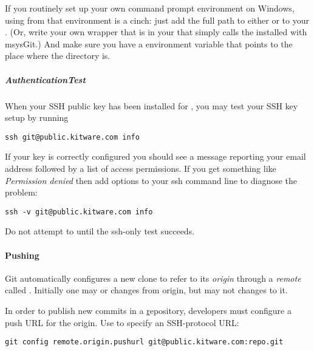 If you routinely set up your own command prompt environment on Windows, using
 from that environment is a cinch: just add the full path
to either  or  to your . (Or, write your
own  wrapper that is in your  that simply calls the
 installed with msysGit.) And make sure you have a 
environment variable that points to the place where the 
directory is.


\subparagraph{AuthenticationTest}
\label{subpar:AuthenticationTest}

When your SSH public key has been installed for ,
you may test your SSH key setup by running

\begin{verbatim}
ssh git@public.kitware.com info
\end{verbatim}

If your key is correctly configured you should see a message reporting your
email address followed by a list of access permissions. If you get something
like \textit{Permission denied} then add  options to your ssh command
line to diagnose the problem:

\begin{verbatim}
ssh -v git@public.kitware.com info
\end{verbatim}

Do not attempt to  until the ssh-only test succeeds.


\paragraph{Pushing}
\label{subpar:Pushing}

Git automatically configures a new clone to refer to its \textit{origin} through
a \textit{remote} called . Initially one may  or
 changes from origin, but may not  changes to it.

In order to publish new commits in a \href{public.kitware.com} repository,
developers must configure a push URL for the origin. Use  to
specify an SSH-protocol URL:

\begin{verbatim}
git config remote.origin.pushurl git@public.kitware.com:repo.git
\end{verbatim}

